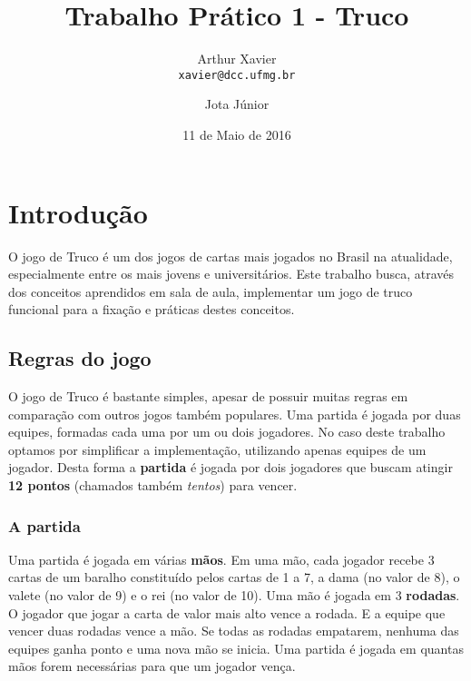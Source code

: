 \documentclass[a4paper,12pt]{article}
\title{Trabalho Prático 1 - Truco}
\author{
    Arthur Xavier\\
    \texttt{xavier@dcc.ufmg.br}
    \and
    Jota Júnior\\
    \texttt{}
}
\date{11 de Maio de 2016}
\begin{document}
\maketitle

\section{Introdução}

O jogo de Truco é um dos jogos de cartas mais jogados no Brasil na atualidade, especialmente entre os mais jovens e universitários. Este trabalho busca, através dos conceitos aprendidos em sala de aula, implementar um jogo de truco funcional para a fixação e práticas destes conceitos.

\subsection{Regras do jogo}
O jogo de Truco é bastante simples, apesar de possuir muitas regras em comparação com outros jogos também populares. Uma partida é jogada por duas equipes, formadas cada uma por um ou dois jogadores. No caso deste trabalho optamos por simplificar a implementação, utilizando apenas equipes de um jogador. Desta forma a \textbf{partida} é jogada por dois jogadores que buscam atingir \textbf{12 pontos} (chamados também \emph{tentos}) para vencer.

\subsubsection{A partida}
Uma partida é jogada em várias \textbf{mãos}. Em uma mão, cada jogador recebe 3 cartas de um baralho constituído pelos cartas de 1 a 7, a dama (no valor de 8), o valete (no valor de 9) e o rei (no valor de 10). Uma mão é jogada em 3 \textbf{rodadas}. O jogador que jogar a carta de valor mais alto vence a rodada. E a equipe que vencer duas rodadas vence a mão. Se todas as rodadas empatarem, nenhuma das equipes ganha ponto e uma nova mão se inicia. Uma partida é jogada em quantas mãos forem necessárias para que um jogador vença.
\end{document}
